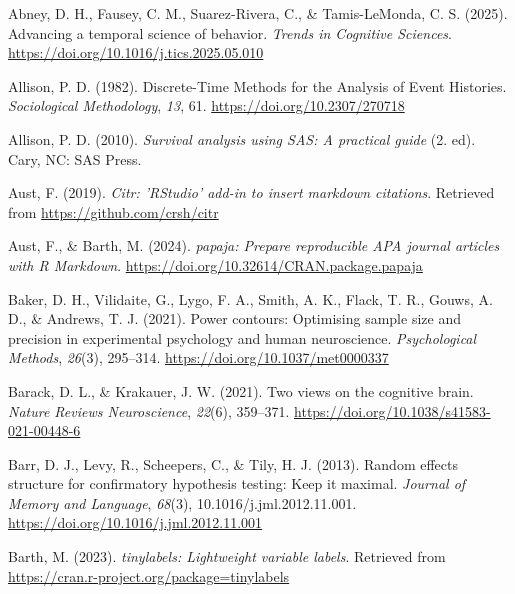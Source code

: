 \documentclass[
  man, donotrepeattitle,floatsintext]{apa6}
\newlength{\cslhangindent}
\newenvironment{CSLReferences}[2] %
 {\begin{list}{}{%
  \setlength{\itemindent}{0pt}
  \setlength{\leftmargin}{0pt}
  \setlength{\parsep}{0pt}
  \ifodd #1
   \setlength{\leftmargin}{\cslhangindent}
   \setlength{\itemindent}{-1\cslhangindent}
  \fi
  \setlength{\itemsep}{#2\baselineskip}}}
 {\end{list}}
\begin{document}
\label{refs}
\begin{CSLReferences}{1}{0}
Abney, D. H., Fausey, C. M., Suarez-Rivera, C., \& Tamis-LeMonda, C. S. (2025). Advancing a temporal science of behavior. \emph{Trends in Cognitive Sciences}. \url{https://doi.org/10.1016/j.tics.2025.05.010}

Allison, P. D. (1982). Discrete-{Time Methods} for the {Analysis} of {Event Histories}. \emph{Sociological Methodology}, \emph{13}, 61. \url{https://doi.org/10.2307/270718}

Allison, P. D. (2010). \emph{Survival analysis using {SAS}: A practical guide} (2. ed). Cary, NC: SAS Press.

Aust, F. (2019). \emph{Citr: 'RStudio' add-in to insert markdown citations}. Retrieved from \url{https://github.com/crsh/citr}

Aust, F., \& Barth, M. (2024). \emph{{papaja}: {Prepare} reproducible {APA} journal articles with {R Markdown}}. \url{https://doi.org/10.32614/CRAN.package.papaja}

Baker, D. H., Vilidaite, G., Lygo, F. A., Smith, A. K., Flack, T. R., Gouws, A. D., \& Andrews, T. J. (2021). Power contours: {Optimising} sample size and precision in experimental psychology and human neuroscience. \emph{Psychological Methods}, \emph{26}(3), 295--314. \url{https://doi.org/10.1037/met0000337}

Barack, D. L., \& Krakauer, J. W. (2021). Two views on the cognitive brain. \emph{Nature Reviews Neuroscience}, \emph{22}(6), 359--371. \url{https://doi.org/10.1038/s41583-021-00448-6}

Barr, D. J., Levy, R., Scheepers, C., \& Tily, H. J. (2013). Random effects structure for confirmatory hypothesis testing: {Keep} it maximal. \emph{Journal of Memory and Language}, \emph{68}(3), 10.1016/j.jml.2012.11.001. \url{https://doi.org/10.1016/j.jml.2012.11.001}

Barth, M. (2023). \emph{{tinylabels}: Lightweight variable labels}. Retrieved from \url{https://cran.r-project.org/package=tinylabels}


\end{CSLReferences}
\end{document}
